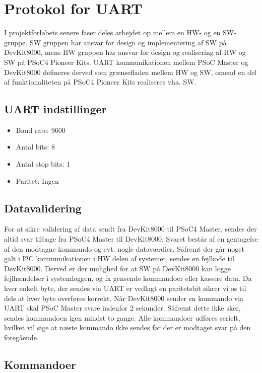 \clearpage
\section{Protokol for UART} \label{UART_Protokol} %

I projektforløbets senere faser deles arbejdet op mellem en HW- og en SW-gruppe. SW gruppen har ansvar for design og implementering af SW på DevKit8000, mens HW gruppen har ansvar for design og realisering af HW og SW på PSoC4 Pioneer Kits. UART kommunikationen mellem PSoC Master og DevKit8000 defineres derved som grænsefladen mellem HW og SW, omend en del af funktionaliteten på PSoC4 Pioneer Kits realiseres vha. SW.

\subsection{UART indstillinger}

\begin{itemize}
\item Baud rate: 9600 
\item Antal bits: 8
\item Antal stop bits: 1
\item Paritet: Ingen
\end{itemize}

\subsection{Datavalidering}

For at sikre validering af data sendt fra DevKit8000 til PSoC4 Master, sendes der altid svar tilbage fra PSoC4 Master til DevKit8000. Svaret består af en gentagelse af den modtagne kommando og evt. nogle dataværdier. \newline
Såfremt der går noget galt i I2C kommunikationen i HW delen af systemet, sendes en fejlkode til DevKit8000. 
Derved er der mulighed for at SW på DevKit8000 kan logge fejlhændelser i systemloggen, og fx gensende kommandoer eller kassere data. \newline
Da hver enkelt byte, der sendes via UART er vedlagt en paritetsbit sikrer vi os til dels at hver byte overføres korrekt. \newline
Når DevKit8000 sender en kommando via UART skal PSoC Master svare indenfor 2 sekunder. Såfremt dette ikke sker, sendes kommandoen igen mindst to gange. Alle kommandoer udføres serielt, hvilket vil sige at næste kommando ikke sendes før der er modtaget svar på den foregående.

\subsection{Kommandoer}

